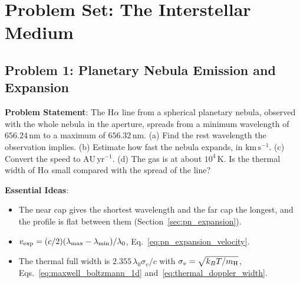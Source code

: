 \section{Problem Set: The Interstellar Medium}

\subsection{Problem 1: Planetary Nebula Emission and Expansion}
\label{is:prob:pn}

\textbf{Problem Statement}: The $\mathrm{H}\alpha$ line from a spherical planetary nebula, observed with the whole nebula in the aperture, spreads from a minimum wavelength of $656.24\,\mathrm{nm}$ to a maximum of $656.32\,\mathrm{nm}$. (a) Find the rest wavelength the observation implies. (b) Estimate how fast the nebula expands, in $\mathrm{km\,s^{-1}}$. (c) Convert the speed to $\mathrm{AU\,yr^{-1}}$. (d) The gas is at about $10^4\,\mathrm K$. Is the thermal width of $\mathrm H\alpha$ small compared with the spread of the line?

\textbf{Essential Ideas}:
\begin{itemize}
	\item The near cap gives the shortest wavelength and the far cap the longest, and the profile is flat between them (Section~\ref{sec:pn_expansion}).
	\item $v_{\rm exp}=(c/2)(\lambda_{\max}-\lambda_{\min})/\lambda_0$, Eq.~\eqref{eq:pn_expansion_velocity}.
	\item The thermal full width is $2.355\,\lambda_0\sigma_v/c$ with $\sigma_v=\sqrt{k_BT/m_{\rm H}}$, Eqs.~\eqref{eq:maxwell_boltzmann_1d} and~\eqref{eq:thermal_doppler_width}.
\end{itemize}

